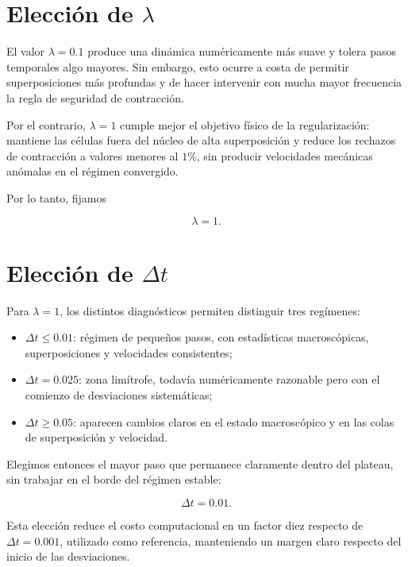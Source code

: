 \documentclass[11pt,a4paper]{article}
\begin{document}
\section{Elección de \texorpdfstring{\(\lambda\)}{lambda}}

El valor \(\lambda=0.1\) produce una dinámica numéricamente más suave y tolera
pasos temporales algo mayores. Sin embargo, esto ocurre a costa de permitir
superposiciones más profundas y de hacer intervenir con mucha mayor frecuencia
la regla de seguridad de contracción.

Por el contrario, \(\lambda=1\) cumple mejor el objetivo físico de la
regularización: mantiene las células fuera del núcleo de alta superposición y
reduce los rechazos de contracción a valores menores al \(1\%\), sin producir
velocidades mecánicas anómalas en el régimen convergido.

Por lo tanto, fijamos

\begin{equation}
\boxed{\lambda=1}.
\end{equation}

\section{Elección de \texorpdfstring{\(\Delta t\)}{Delta t}}

Para \(\lambda=1\), los distintos diagnósticos permiten distinguir tres
regímenes:

\begin{itemize}
    \item \(\Delta t\leq0.01\): régimen de pequeños pasos, con estadísticas
    macroscópicas, superposiciones y velocidades consistentes;
    \item \(\Delta t=0.025\): zona limítrofe, todavía numéricamente razonable
    pero con el comienzo de desviaciones sistemáticas;
    \item \(\Delta t\geq0.05\): aparecen cambios claros en el estado
    macroscópico y en las colas de superposición y velocidad.
\end{itemize}

Elegimos entonces el mayor paso que permanece claramente dentro del plateau,
sin trabajar en el borde del régimen estable:

\begin{equation}
\boxed{\Delta t=0.01}.
\end{equation}

Esta elección reduce el costo computacional en un factor diez respecto de
\(\Delta t=0.001\), utilizado como referencia, manteniendo un margen claro
respecto del inicio de las desviaciones.
\end{document}
